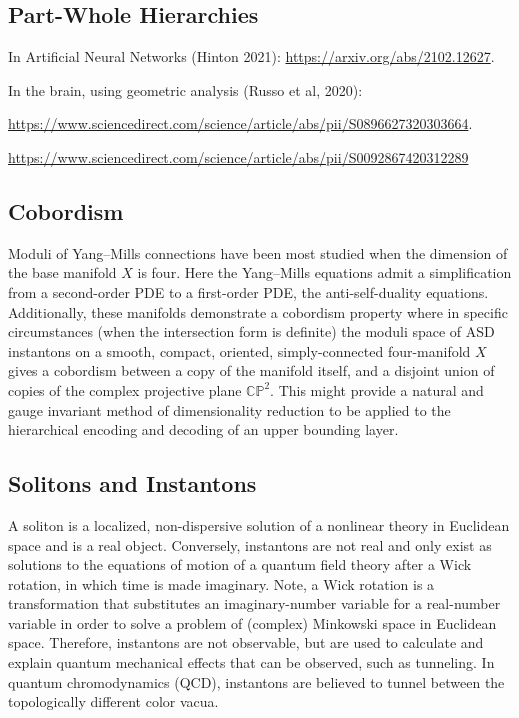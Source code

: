 \documentclass{article}
\begin{document}
    
    \subsection{Part-Whole Hierarchies}
    In Artificial Neural Networks (Hinton 2021): \url{https://arxiv.org/abs/2102.12627}.
    
    In the brain, using geometric analysis (Russo et al, 2020):
    
    \url{https://www.sciencedirect.com/science/article/abs/pii/S0896627320303664}.
    
    \url{https://www.sciencedirect.com/science/article/abs/pii/S0092867420312289}
    
    \subsection{Cobordism}
    Moduli of Yang–Mills connections have been most studied when the dimension of the base manifold $X$ is four. Here the Yang–Mills equations admit a simplification from a second-order PDE to a first-order PDE, the anti-self-duality equations. 
    Additionally, these manifolds demonstrate a cobordism property where in specific circumstances (when the intersection form is definite) the moduli space of ASD instantons on a smooth, compact, oriented, simply-connected four-manifold $X$ gives a cobordism between a copy of the manifold itself, and a disjoint union of copies of the complex projective plane ${\displaystyle \mathbb {CP} ^{2}}$. This might provide a natural and gauge invariant method of dimensionality reduction to be applied to the hierarchical encoding and decoding of an upper bounding layer.
        
    \subsection{Solitons and Instantons}
    
    A soliton is a localized, non-dispersive solution of a nonlinear theory in Euclidean space and is a real object. Conversely, instantons are not real and only exist as solutions to the equations of motion of a quantum field theory after a Wick rotation, in which time is made imaginary. Note, a Wick rotation is a transformation that substitutes an imaginary-number variable for a real-number variable in order to solve a problem of (complex) Minkowski space in Euclidean space. Therefore, instantons are not observable, but are used to calculate and explain quantum mechanical effects that can be observed, such as tunneling. In quantum chromodynamics (QCD), instantons are believed to tunnel between the topologically different color vacua.
    
\end{document}
